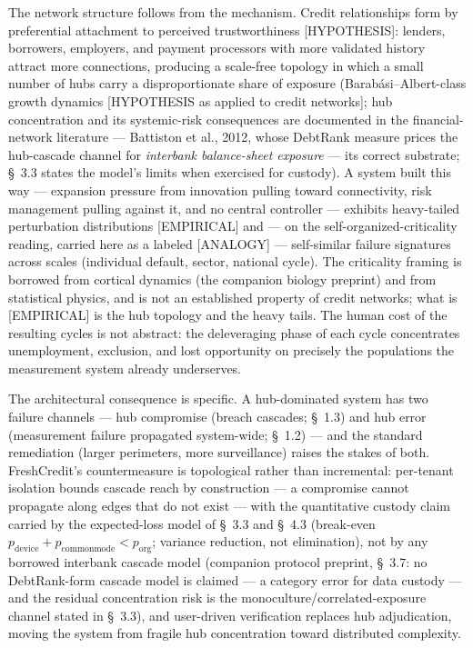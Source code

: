 \documentclass[
]{article}
\begin{document}
The network structure follows from the mechanism. Credit relationships
form by preferential attachment to perceived trustworthiness
{[}HYPOTHESIS{]}: lenders, borrowers, employers, and payment processors
with more validated history attract more connections, producing a
scale-free topology in which a small number of hubs carry a
disproportionate share of exposure (Barabási--Albert-class growth
dynamics {[}HYPOTHESIS as applied to credit networks{]}; hub
concentration and its systemic-risk consequences are documented in the
financial-network literature --- Battiston et al., 2012, whose DebtRank
measure prices the hub-cascade channel for \emph{interbank balance-sheet
exposure} --- its correct substrate; §~3.3 states the model's limits
when exercised for custody). A system built this way --- expansion
pressure from innovation pulling toward connectivity, risk management
pulling against it, and no central controller --- exhibits heavy-tailed
perturbation distributions {[}EMPIRICAL{]} and --- on the
self-organized-criticality reading, carried here as a labeled
{[}ANALOGY{]} --- self-similar failure signatures across scales
(individual default, sector, national cycle). The criticality framing is
borrowed from cortical dynamics (the companion biology preprint) and
from statistical physics, and is not an established property of credit
networks; what is {[}EMPIRICAL{]} is the hub topology and the heavy
tails. The human cost of the resulting cycles is not abstract: the
deleveraging phase of each cycle concentrates unemployment, exclusion,
and lost opportunity on precisely the populations the measurement system
already underserves.

The architectural consequence is specific. A hub-dominated system has
two failure channels --- hub compromise (breach cascades; §~1.3) and hub
error (measurement failure propagated system-wide; §~1.2) --- and the
standard remediation (larger perimeters, more surveillance) raises the
stakes of both. FreshCredit's countermeasure is topological rather than
incremental: per-tenant isolation bounds cascade reach by construction
--- a compromise cannot propagate along edges that do not exist --- with
the quantitative custody claim carried by the expected-loss model of
§~3.3 and §~4.3 (break-even
\(p_{\mathrm{device}} + p_{\mathrm{commonmode}} < p_{\mathrm{org}}\);
variance reduction, not elimination), not by any borrowed interbank
cascade model (companion protocol preprint, §~3.7: no DebtRank-form
cascade model is claimed --- a category error for data custody --- and
the residual concentration risk is the monoculture/correlated-exposure
channel stated in §~3.3), and user-driven verification replaces hub
adjudication, moving the system from fragile hub concentration toward
distributed complexity.
\end{document}
